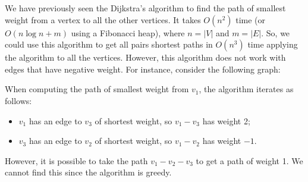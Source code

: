 \documentclass[a4paper, openany]{memoir}
\begin{document}
    We have previously seen the Dijkstra's algorithm to find the path of smallest weight from a vertex to all the other vertices. It takes $O(n^2)$ time (or $O(n \log n + m)$ using a Fibonacci heap), where $n = |V|$ and $m = |E|$. So, we could use this algorithm to get all pairs shortest paths in $O(n^3)$ time applying the algorithm to all the vertices. However, this algorithm does not work with edges that have negative weight. For instance, consider the following graph:
    \begin{figure}[H]
        \centering
    \end{figure}
    \noindent When computing the path of smallest weight from $v_1$, the algorithm iterates as follows:
    \begin{itemize}
        \item $v_1$ has an edge to $v_3$ of shortest weight, so $v_1 - v_3$ has weight 2;
        \item $v_3$ has an edge to $v_2$ of shortest weight, so $v_1 - v_2$ has weight $-1$.
    \end{itemize}
    However, it is possible to take the path $v_1 - v_2 - v_3$ to get a path of weight 1. We cannot find this since the algorithm is greedy.
\end{document}
